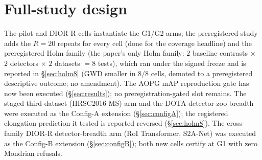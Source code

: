 \documentclass[11pt]{article}
\begin{document}
\section{Full-study design}\label{sec:fullstudy}
The pilot and DIOR-R cells instantiate the G1/G2 arms; the preregistered study adds the $R{=}20$ repeats for
every cell (done for the coverage headline) and the preregistered
Holm family (the paper's only Holm family: $2$ baseline contrasts $\times$ $2$ detectors $\times$ $2$ datasets
$=8$ tests), which ran under the signed freeze and is reported in \S\ref{sec:holm8} (GWD smaller in $8/8$
cells, demoted to a preregistered descriptive outcome; no amendment). The AOPG mAP reproduction gate has now
been executed (\S\ref{sec:results}); no preregistration-gated slot remains. The staged third-dataset
(HRSC2016-MS) arm and the DOTA detector-zoo breadth were executed as the Config-A extension
(\S\ref{sec:configA}); the registered elongation prediction it tested is reported reversed (\S\ref{sec:holm8}).
The cross-family DIOR-R detector-breadth arm (RoI Transformer, S2A-Net) was executed as the Config-B
extension (\S\ref{sec:configB}); both new cells certify at G1 with zero Mondrian refusals.
\end{document}
